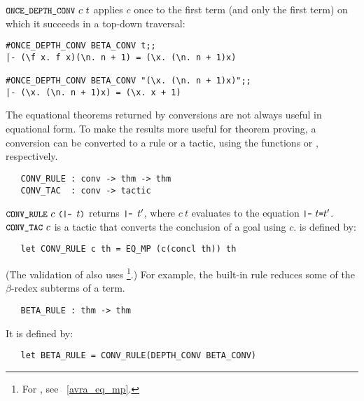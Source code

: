 \noindent $\ml{ONCE\_DEPTH\_CONV}\ c\ t$ applies $c$ once to the first
term (and only the first term) 
on which it succeeds in a top-down traversal:

\begin{session}\begin{verbatim}
#ONCE_DEPTH_CONV BETA_CONV t;;
|- (\f x. f x)(\n. n + 1) = (\x. (\n. n + 1)x)

#ONCE_DEPTH_CONV BETA_CONV "(\x. (\n. n + 1)x)";;
|- (\x. (\n. n + 1)x) = (\x. x + 1)
\end{verbatim}\end{session}

The equational theorems returned by conversions are not always
useful in equational form.  To make the results more useful for theorem
proving,
a conversion can be converted to a rule or a tactic, using the functions
 or , respectively.


\begin{boxed}
\begin{verbatim}
   CONV_RULE : conv -> thm -> thm
   CONV_TAC  : conv -> tactic
\end{verbatim}\end{boxed}

\noindent $\ml{CONV\_RULE}\ c\ \ml{(|- }t\ml{)}$ returns $\ml{|- }t'$, where
$c\ t$ evaluates to the equation
$\ml{|-}\ t\ml{=}t'$. 
$\ml{CONV\_TAC}\ c$ is a tactic that
converts the conclusion of a goal using $c$.  is defined by:

\begin{hol}\begin{verbatim}
   let CONV_RULE c th = EQ_MP (c(concl th)) th
\end{verbatim}\end{hol}

\noindent (The validation of  also 
uses \footnote{For , see ~\ref{avra_eq_mp}.}.)
For example, the built-in rule  reduces some
of the $\beta$-redex subterms of a term.

\begin{boxed}
\begin{verbatim}
   BETA_RULE : thm -> thm
\end{verbatim}\end{boxed}

\noindent It is defined by:

\begin{hol}\begin{verbatim}
   let BETA_RULE = CONV_RULE(DEPTH_CONV BETA_CONV)
\end{verbatim}\end{hol}

